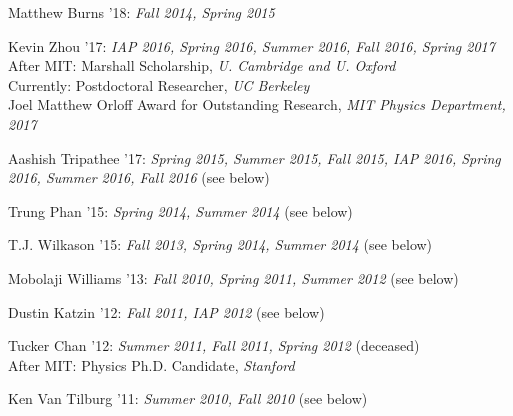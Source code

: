 \item Matthew Burns '18: \emph{Fall 2014, Spring 2015}

\item Kevin Zhou '17: \emph{IAP 2016, Spring 2016, Summer 2016, Fall 2016, Spring 2017}
\\ After MIT: Marshall Scholarship, \emph{U. Cambridge and U. Oxford}
\\ Currently: Postdoctoral Researcher, \emph{UC Berkeley}
\\ Joel Matthew Orloff Award for Outstanding Research, \emph{MIT Physics Department, 2017}

\item Aashish Tripathee '17: \emph{Spring 2015, Summer 2015, Fall 2015, IAP 2016, Spring 2016, Summer 2016, Fall 2016} (see below) 

\item Trung Phan '15: \emph{Spring 2014, Summer 2014} (see below) 

\item T.J. Wilkason '15: \emph{Fall 2013, Spring 2014, Summer 2014} (see below) 

\item Mobolaji Williams '13: \emph{Fall 2010, Spring 2011, Summer 2012} (see below) 

\item Dustin Katzin '12: \emph{Fall 2011, IAP 2012} (see below) 

\item Tucker Chan '12: \emph{Summer 2011, Fall 2011, Spring 2012} (deceased) 
\\ After MIT: Physics Ph.D. Candidate, \emph{Stanford}

\item Ken Van Tilburg '11: \emph{Summer 2010, Fall 2010} (see below) 

\el
